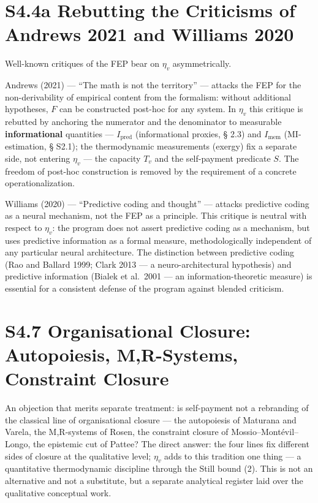 \documentclass[pdflatex,sn-mathphys-ay]{sn-jnl}
\begin{document}
\section*{S4.4a Rebutting the Criticisms of Andrews 2021 and Williams 2020}\label{s4.4a-rebutting-the-criticisms-of-andrews-2021-and-williams-2020}

Well-known critiques of the FEP bear on \(\eta_v\) asymmetrically.

Andrews (2021) --- ``The math is not the territory'' --- attacks the FEP for the non-derivability of empirical content from the formalism: without additional hypotheses, \(F\) can be constructed post-hoc for any system. In \(\eta_v\) this critique is rebutted by anchoring the numerator and the denominator to measurable \textbf{informational} quantities --- \(I_{\text{pred}}\) (informational proxies, § 2.3) and \(I_{\text{mem}}\) (MI-estimation, § S2.1); the thermodynamic measurements (exergy) fix a separate side, not entering \(\eta_v\) --- the capacity \(T_v\) and the self-payment predicate \(S\). The freedom of post-hoc construction is removed by the requirement of a concrete operationalization.

Williams (2020) --- ``Predictive coding and thought'' --- attacks predictive coding as a neural mechanism, not the FEP as a principle. This critique is neutral with respect to \(\eta_v\): the program does not assert predictive coding as a mechanism, but uses predictive information as a formal measure, methodologically independent of any particular neural architecture. The distinction between predictive coding (Rao and Ballard 1999; Clark 2013 --- a neuro-architectural hypothesis) and predictive information (Bialek et al.~2001 --- an information-theoretic measure) is essential for a consistent defense of the program against blended criticism.

\section*{S4.7 Organisational Closure: Autopoiesis, M,R-Systems, Constraint Closure}\label{s4.7-organisational-closure-autopoiesis-mr-systems-constraint-closure}

An objection that merits separate treatment: is self-payment not a rebranding of the classical line of organisational closure --- the autopoiesis of Maturana and Varela, the M,R-systems of Rosen, the constraint closure of Mossio--Montévil--Longo, the epistemic cut of Pattee? The direct answer: the four lines fix different sides of closure at the qualitative level; \(\eta_v\) adds to this tradition one thing --- a quantitative thermodynamic discipline through the Still bound (2). This is not an alternative and not a substitute, but a separate analytical register laid over the qualitative conceptual work.
\end{document}
